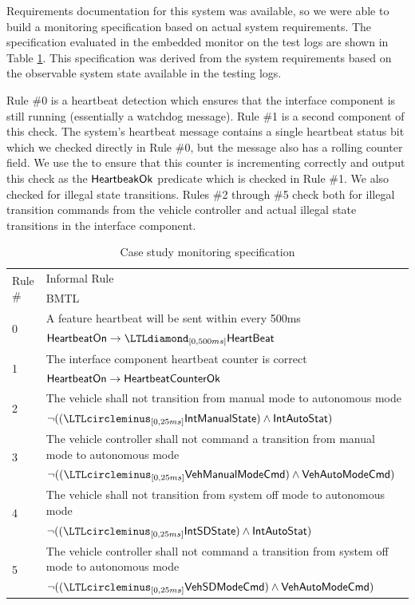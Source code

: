 Requirements documentation for this system was available, so we were able to build a monitoring specification based on actual system requirements.
The specification evaluated in the embedded monitor on the test logs are shown in Table \ref{tab:monspec}. This specification was derived from the system requirements based on the observable system state available in the testing logs. 


Rule \#0 is a heartbeat detection which ensures that the interface component is still running (essentially a watchdog message). Rule \#1 is a second component of this check. The system's heartbeat message contains a single heartbeat status bit which we checked directly in Rule \#0, but the message also has a rolling counter field. We use the \sfmap to ensure that this counter is incrementing correctly and output this check as the $\mathsf{HeartbeakOk}$ predicate which is checked in Rule \#1.
We also checked for illegal state transitions. Rules \#2 through \#5 check both for illegal transition commands from the vehicle controller and actual illegal state transitions in the interface component.

\begin{table}[t]
\begin{tabular}{|l|p{4.5in}|}
\hline \multirow{2}{*}{Rule \#} & Informal Rule \\ & BMTL \\
\hline \multirow{2}{*}{0} & A feature heartbeat will be sent within every 500ms \\
& $\pred{HeartbeatOn} \rightarrow \LTLdiamond_{[0,500ms]} \pred{HeartBeat}$ \\
\hline \multirow{2}{*}{1} & The interface component heartbeat counter is correct \\
& $\mathsf{HeartbeatOn} \rightarrow \mathsf{HeartbeatCounterOk}$ \\
\hline \multirow{2}{*}{2} & The vehicle shall not transition from manual mode to autonomous mode \\
&  $\neg ((\LTLcircleminus_{[0,25ms]} \pred{IntManualState}) \wedge \pred{IntAutoStat})$\\
\hline \multirow{2}{*}{3} & The vehicle controller shall not command a transition from manual mode to autonomous mode \\
& $\neg ((\LTLcircleminus_{[0,25ms]} \pred{VehManualModeCmd}) \wedge \pred{VehAutoModeCmd})$\\
\hline \multirow{2}{*}{4} & The vehicle shall not transition from system off mode to autonomous mode \\ 
&  $\neg ((\LTLcircleminus_{[0,25ms]} \pred{IntSDState}) \wedge \pred{IntAutoStat})$\\
\hline \multirow{2}{*}{5} & The vehicle controller shall not command a transition from system off mode to autonomous mode \\
& $\neg ((\LTLcircleminus_{[0,25ms]} \pred{VehSDModeCmd}) \wedge \pred{VehAutoModeCmd})$\\
\hline
\end{tabular}
\caption{Case study monitoring specification \label{tab:monspec}}
\end{table}

